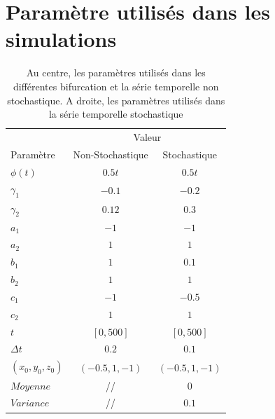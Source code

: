 \section{Paramètre utilisés dans les simulations}
\begin{table}[H]
\centering
\begin{tabular}{lcc} \toprule
  & \multicolumn {2}{c}{Valeur} \\\cmidrule(lr) {2-3}
  Paramètre         & Non-Stochastique                & Stochastique\\\hline
  $\phi(t)$         & $0.5t$                          & $0.5t$ \\
  $\gamma_1$        & $-0.1$                          & $-0.2$ \\
  $\gamma_2$        & $0.12$                          & $0.3$ \\
  $a_1$             & $-1$                            & $-1$ \\
  $a_2$             & $1$                             & $1$ \\
  $b_1$             & $1$                             & $0.1$ \\
  $b_2$             & $1$                             & $1$ \\
  $c_1$             & $-1$                            & $-0.5$ \\
  $c_2$             & $1$                             & $1$ \\
  $t$               & $[0, 500]$                      & $[0, 500]$ \\
  $\Delta t$        & $0.2$                           & $0.1$ \\
  $(x_0, y_0, z_0)$ & $(-0.5, 1, -1)$                 & $(-0.5, 1, -1)$ \\
  $Moyenne$         & //                              & $0$ \\
  $Variance$        & //                              & $0.1$ \\\hline
\end{tabular}
\caption{Au centre, les paramètres utilisés dans les différentes bifurcation et la série temporelle non stochastique. A droite, les paramètres utilisés dans la série temporelle stochastique}
\label{tab:parameters}
\end{table}
